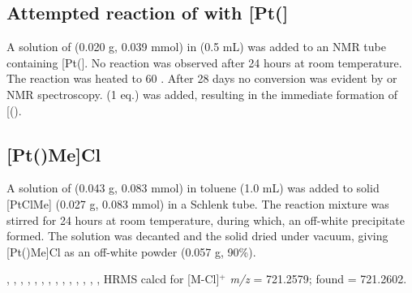 \subsection*{Attempted reaction of \tButhixantphos{} with [Pt(]}

A solution of \tButhixantphos{} (0.020 g, 0.039 mmol) in  (0.5 mL) was added to an NMR tube containing [Pt(].  No reaction was observed after 24 hours at room temperature.  The reaction was heated to 60 \degC{}.  After 28 days no conversion was evident by \phosphorus{} or \proton{} NMR spectroscopy.   (1 eq.) was added, resulting in the immediate formation of [(\tButhixantphos)\ce{H]+}.

\subsection*{[Pt(\tButhixantphosk)Me]Cl}


A solution of \tButhixantphos{} (0.043 g, 0.083 mmol) in toluene (1.0 mL) was added to solid [PtClMe] (0.027 g, 0.083 mmol) in a Schlenk tube.  The reaction mixture was stirred for 24 hours at room temperature, during which, an off-white precipitate formed.  The solution was decanted and the   solid dried under vacuum, giving [Pt(\tButhixantphos)Me]Cl as an off-white powder (0.057 g, 90\%).

,
,
,
,
,
,
,
,
,
,
,
,
,
,
HRMS calcd for  [M-Cl]$^+$ \emph{m/z} = 721.2579; found = 721.2602.


